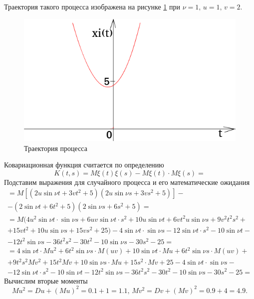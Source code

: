 Траектория такого процесса изображена на рисунке \ref{fig:214} при $ \nu = 1, \, u = 1, \, v = 2$.

\begin{figure}[h!]
 \centering
 \includegraphics[width=.5\textwidth]{./pictures/2_14.png}
 \caption{Траектория процесса}
 \label{fig:214}
\end{figure}

Ковариационная функция считается по определению
$$K \left( t, s \right) =
  M \xi \left( t \right) \xi \left( s \right) -
    M \xi \left( t \right) \cdot M \xi \left( s \right) =$$
Подставим выражения для случайного процесса и его математические ожидания
\begin{equation*}
  \begin{split}
    = M \left[
      \left( 2u \sin \nu t + 3vt^2 + 5 \right) \left( 2u \sin \nu s + 3vs^2 + 5 \right) \right] - \\
    - \left( 2 \sin \nu t + 6t^2 + 5 \right) \left( 2 \sin \nu s + 6s^2 + 5 \right) = \\
    = M(4u^2 \sin \nu t \cdot \sin \nu s + 6uv \sin \nu t \cdot s^2 + 10u \sin \nu t +
      6vt^2 u \sin \nu s + 9v^2 t^2 s^2 + \\
      + 15vt^2 + 10u \sin \nu s + 15vs^2 + 25) -
    4 \sin \nu t \cdot \sin \nu s - 12 \sin \nu t \cdot s^2 - 10 \sin \nu t - \\
    - 12t^2 \sin \nu s - 36t^2 s^2 - 30t^2 - 10 \sin \nu s - 30s^2 - 25 = \\
    = 4 \sin \nu t \cdot Mu^2 + 6t^2 \sin \nu s \cdot M \left( uv \right) + 10 \sin \nu t \cdot Mu +
    6t^2 \sin \nu s \cdot M \left( uv \right) + \\
    + 9t^2 s^2 Mv^2 + 15t^2 Mv + 10 \sin \nu s \cdot Mu + 15s^2 \cdot Mv + 25 -
    4 \sin \nu t \cdot \sin \nu s - \\
    - 12 \sin \nu t \cdot s^2 - 10 \sin \nu t - 12t^2 \sin \nu s - 36t^2 s^2 - 30t^2 -
    10 \sin \nu s - 30s^2 - 25 =
  \end{split}
\end{equation*}
Вычислим вторые моменты
$$Mu^2 = Du + \left( Mu \right)^2 = 0.1 + 1 = 1.1, \,
  Mv^2 = Dv + \left( Mv \right)^2 = 0.9 + 4 = 4.9.$$
